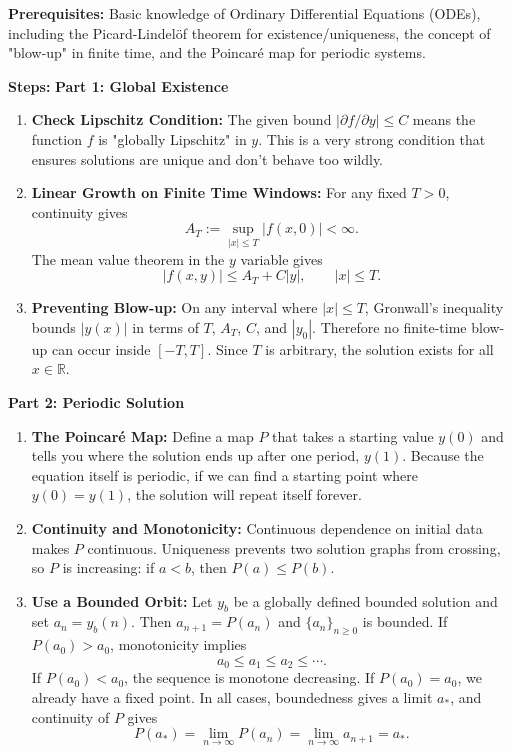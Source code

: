 \begin{solution}
\textbf{Prerequisites:}
Basic knowledge of Ordinary Differential Equations (ODEs), including the Picard-Lindelöf theorem for existence/uniqueness, the concept of "blow-up" in finite time, and the Poincaré map for periodic systems.


\textbf{Steps:}
\textbf{Part 1: Global Existence}
\begin{enumerate}
    \item \textbf{Check Lipschitz Condition:} The given bound $|\partial f / \partial y| \leq C$ means the function $f$ is "globally Lipschitz" in $y$. This is a very strong condition that ensures solutions are unique and don't behave too wildly.

    \item \textbf{Linear Growth on Finite Time Windows:} For any fixed $T>0$, continuity gives
    \[
    A_T:=\sup_{|x|\leq T}|f(x,0)|<\infty.
    \]
    The mean value theorem in the $y$ variable gives
    \[
    |f(x,y)|\leq A_T+C|y|,
    \qquad |x|\leq T.
    \]

    \item \textbf{Preventing Blow-up:} On any interval where $|x|\leq T$, Gronwall's inequality bounds $|y(x)|$ in terms of $T$, $A_T$, $C$, and $|y_0|$. Therefore no finite-time blow-up can occur inside $[-T,T]$. Since $T$ is arbitrary, the solution exists for all $x\in\mathbb{R}$.
\end{enumerate}

\textbf{Part 2: Periodic Solution}
\begin{enumerate}
    \item \textbf{The Poincaré Map:} Define a map $P$ that takes a starting value $y(0)$ and tells you where the solution ends up after one period, $y(1)$. Because the equation itself is periodic, if we can find a starting point where $y(0) = y(1)$, the solution will repeat itself forever.

    \item \textbf{Continuity and Monotonicity:} Continuous dependence on initial data makes $P$ continuous. Uniqueness prevents two solution graphs from crossing, so $P$ is increasing: if $a<b$, then $P(a)\leq P(b)$.

    \item \textbf{Use a Bounded Orbit:} Let $y_b$ be a globally defined bounded solution and set $a_n=y_b(n)$. Then $a_{n+1}=P(a_n)$ and $\{a_n\}_{n\geq0}$ is bounded. If $P(a_0)>a_0$, monotonicity implies
    \[
    a_0\leq a_1\leq a_2\leq\cdots.
    \]
    If $P(a_0)<a_0$, the sequence is monotone decreasing. If $P(a_0)=a_0$, we already have a fixed point. In all cases, boundedness gives a limit $a_*$, and continuity of $P$ gives
    \[
    P(a_*)=\lim_{n\to\infty}P(a_n)
    =\lim_{n\to\infty}a_{n+1}
    =a_*.
    \]


\end{enumerate}
\end{solution}
